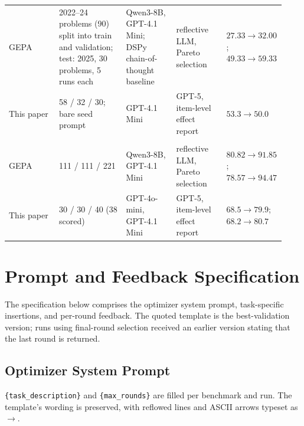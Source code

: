 \documentclass[10pt]{article} %
\begin{document}
\begin{table}[htbp]
\begin{center}
\begin{tabular}{@{}p{0.18\linewidth}p{0.24\linewidth}p{0.18\linewidth}p{0.18\linewidth}p{0.15\linewidth}@{}}
GEPA~\citep{agrawal2026gepa} & 2022--24 problems (90) split into train and validation; test: 2025, 30 problems, 5 runs each & Qwen3-8B, GPT-4.1 Mini; DSPy chain-of-thought baseline & reflective LLM, Pareto selection & $27.33\rightarrow 32.00$; $49.33\rightarrow 59.33$ \\
\rowcolor{softblue}This paper & 58 / 32 / 30; bare seed prompt & GPT-4.1 Mini & GPT-5, item-level effect report & $53.3\rightarrow 50.0$ \\
\midrule
\rowcolor{midgreen}\multicolumn{5}{l}{\textbf{PUPA}} \\
GEPA~\citep{agrawal2026gepa} & 111 / 111 / 221 & Qwen3-8B, GPT-4.1 Mini & reflective LLM, Pareto selection & $80.82\rightarrow 91.85$; $78.57\rightarrow 94.47$ \\
\rowcolor{softblue}This paper & 30 / 30 / 40 (38 scored) & GPT-4o-mini, GPT-4.1 Mini & GPT-5, item-level effect report & $68.5\rightarrow 79.9$; $68.2\rightarrow 80.7$ \\
\bottomrule
\end{tabular}
\end{center}
\end{table}

\FloatBarrier
\section{Prompt and Feedback Specification}
\label{app:prompts}
The specification below comprises the optimizer system prompt, task-specific insertions, and per-round feedback.
The quoted template is the best-validation version; runs using final-round selection received an earlier version
stating that the last round is returned.

\subsection{Optimizer System Prompt}
\label{app:sysprompt}
\texttt{\{task\_description\}} and \texttt{\{max\_rounds\}} are filled per benchmark and run. The template's wording is
preserved, with reflowed lines and ASCII arrows typeset as $\rightarrow$.
\end{document}
